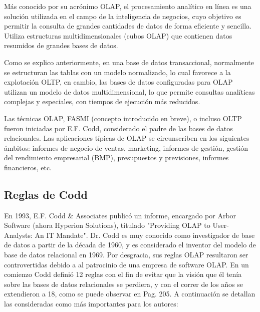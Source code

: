 \documentclass[a4paper,11pt]{article}
\begin{document}
    Más conocido por su acrónimo OLAP, el procesamiento analítico en línea es una solución utilizada en el campo de la inteligencia de negocios, cuyo 
    objetivo es permitir la consulta de grandes cantidades de datos de forma eficiente y sencilla. Utiliza estructuras multidimensionales (cubos OLAP) que 
    contienen datos resumidos de grandes bases de datos.\par
    
    Como se explico anteriormente, en una base de datos transaccional, normalmente se estructuran las tablas con un modelo normalizado, lo cual favorece a
    la explotación OLTP, en cambio, las bases de datos configuradas para OLAP utilizan un modelo de datos multidimensional, lo que permite consultas 
    analíticas complejas y especiales, con tiempos de ejecución más reducidos.\par

    Las técnicas OLAP, FASMI (concepto introducido en breve), o incluso OLTP fueron iniciadas por E.F. Codd, considerado el padre de las bases de datos
    relacionales. Las aplicaciones típicas de OLAP se circunscriben en los siguientes ámbitos: informes de negocio de ventas, marketing, informes de gestión,
    gestión del rendimiento empresarial (BMP), presupuestos y previsiones, informes financieros, etc.
    
    
    \subsection{Reglas de Codd}
    
    En 1993, E.F. Codd \& Associates publicó un informe, encargado por Arbor Software (ahora Hyperion Solutions), titulado "Providing OLAP to User-Analysts:
    An IT Mandate". Dr. Codd es muy conocido como investigador de base de datos a partir de la década de 1960, y es considerado el inventor del modelo
    de base de datos relacional en 1969. Por desgracia, sus reglas OLAP resultaron ser controvertidas debido a al patrocinio de una empresa de software OLAP.
    En un comienzo Codd definió 12 reglas con el fin de evitar que la visión que él tenía sobre las bases de datos relacionales se perdiera, y con el correr
    de los años se extendieron a 18, como se puede observar en \cite{nagabhushana} Pag. 205. A continuación se detallan las consideradas como más importantes 
    para los autores:
    
\end{document}
